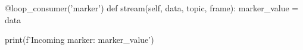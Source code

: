 \begin{python}
@loop_consumer('marker')
def stream(self, data, topic, frame):
    marker_value = data

    print(f'Incoming marker: {marker_value}')
\end{python}